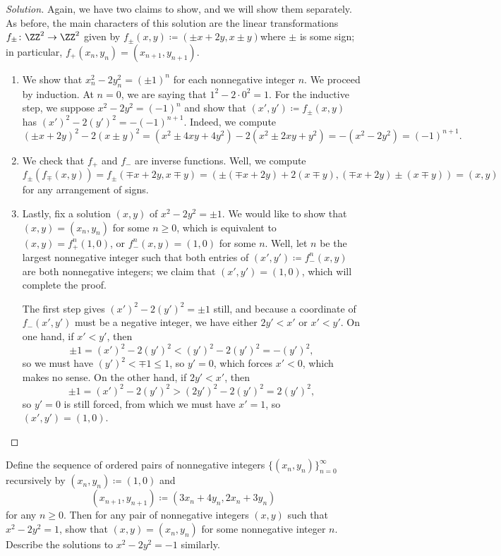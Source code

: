\documentclass[../notes.tex]{subfiles}
\begin{document}
\begin{proof}[Solution]
	Again, we have two claims to show, and we will show them separately. As before, the main characters of this solution are the linear transformations $f_\pm\colon\ZZ^2\to\ZZ^2$ given by $f_\pm(x,y)\coloneqq(\pm x+2y,x\pm y)$where $\pm$ is some sign; in particular, $f_+(x_n,y_n)=(x_{n+1},y_{n+1})$.
	\begin{enumerate}
		\item We show that $x_n^2-2y_n^2=(\pm1)^n$ for each nonnegative integer $n$. We proceed by induction. At $n=0$, we are saying that $1^2-2\cdot0^2=1$. For the inductive step, we suppose $x^2-2y^2=(-1)^n$ and show that $(x',y')\coloneqq f_\pm(x,y)$ has $(x')^2-2(y')^2=-(-1)^{n+1}$. Indeed, we compute
		\[(\pm x+2y)^2-2(x\pm y)^2=\left(x^2\pm4xy+4y^2\right)-2\left(x^2\pm2xy+y^2\right)=-\left(x^2-2y^2\right)=(-1)^{n+1}.\]
		\item We check that $f_+$ and $f_-$ are inverse functions. Well, we compute
		\[f_\pm(f_\mp(x,y))=f_\pm(\mp x+2y,x\mp y)=(\pm(\mp x+2y)+2(x\mp y),(\mp x+2y)\pm(x\mp y))=(x,y)\]
		for any arrangement of signs.
		\item Lastly, fix a solution $(x,y)$ of $x^2-2y^2=\pm1$. We would like to show that $(x,y)=(x_n,y_n)$ for some $n\ge0$, which is equivalent to $(x,y)=f_+^n(1,0)$, or $f^n_-(x,y)=(1,0)$ for some $n$. Well, let $n$ be the largest nonnegative integer such that both entries of $(x',y')\coloneqq f_-^n(x,y)$ are both nonnegative integers; we claim that $(x',y')=(1,0)$, which will complete the proof.

		The first step gives $(x')^2-2(y')^2=\pm1$ still, and because a coordinate of $f_-(x',y')$ must be a negative integer, we have either $2y'<x'$ or $x'<y'$. On one hand, if $x'<y'$, then
		\[\pm1=(x')^2-2(y')^2<(y')^2-2(y')^2=-(y')^2,\]
		so we must have $(y')^2<\mp1\le1$, so $y'=0$, which forces $x'<0$, which makes no sense. On the other hand, if $2y'<x'$, then
		\[\pm1=(x')^2-2(y')^2>(2y')^2-2(y')^2=2(y')^2,\]
		so $y'=0$ is still forced, from which we must have $x'=1$, so $(x',y')=(1,0)$.
		\qedhere
	\end{enumerate}
\end{proof}
\begin{exe} \label{exe:norm-1-pell-2}
	Define the sequence of ordered pairs of nonnegative integers $\{(x_n,y_n)\}_{n=0}^\infty$ recursively by $(x_n,y_n)\coloneqq(1,0)$ and
	\[(x_{n+1},y_{n+1})\coloneqq(3x_n+4y_n,2x_n+3y_n)\]
	for any $n\ge0$. Then for any pair of nonnegative integers $(x,y)$ such that $x^2-2y^2=1$, show that $(x,y)=(x_n,y_n)$ for some nonnegative integer $n$. Describe the solutions to $x^2-2y^2=-1$ similarly.
\end{exe}
\end{document}
